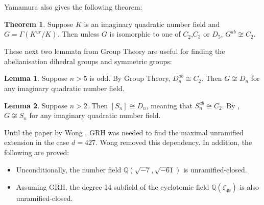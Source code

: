 \documentclass[12pt]{extarticle}
\newcommand{\Q}{\mathbb{Q}}
\newcommand{\<}{\langle}
\renewcommand{\>}{\rangle}
\theoremstyle{definition}
\newtheorem{theorem}{Theorem}
\newtheorem{lemma}{Lemma}
\begin{document}
Yamamura also gives the following theorem: 
\begin{theorem}
\label{thm:yam_group}
Suppose $K$ is an imaginary quadratic number field and $G = \Gamma(K^{ur}/K)$. Then unless $G$ is isomorphic to one of $C_2$,$C_3$ or $D_5$, $G^{ab} \not \cong C_2$. 
\end{theorem}
These next two lemmata from Group Theory are useful for finding the abelianisation dihedral groups and symmetric groups:
\begin{lemma}
Suppose $n>5$ is odd. By Group Theory, $D_n^{ab} \cong C_2$. Then $G \not \cong D_n$ for any imaginary quadratic number field.
\end{lemma}
\begin{lemma}
Suppose $n>2$. Then $[S_n] \cong D_n$, meaning that $S_n^{ab} \cong C_2$. By , $G \not \cong S_n$ for any imaginary quadratic number field.
\end{lemma}
Until the paper by Wong \cite{Wong2015}, GRH was needed to find the maximal unramified extension in the case $d = 427$. Wong removed this dependency. In addition, the following are proved:
\begin{itemize}
\item Unconditionally, the number field $\Q(\sqrt{-7},\sqrt{-61})$ is unramified-closed.
\item Assuming GRH, the degree 14 subfield of the cyclotomic field $\Q(\zeta_{49})$ is also unramified-closed. 
\end{itemize}
\end{document}
